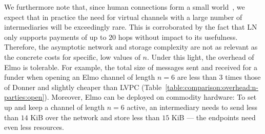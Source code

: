  We furthermore note that, since human connections form a
  small world~\cite{smallworld}, we expect that in practice the
  need for virtual channels with a large number of
  intermediaries will be exceedingly rare. This is corroborated by
  the fact that LN only supports payments of up to $20$ hops
  without impact to its usefulness. Therefore, the asymptotic
  network and storage complexity are not as relevant as the
  concrete costs for specific, low values of $n$. Under this
  light, the overhead of Elmo is tolerable. For example, the
  total size of messages sent and received for a funder when opening an Elmo channel
  of length $n=6$ are less than $3$ times those of Donner and
  slightly cheaper than LVPC
  (Table~\ref{table:comparison:overhead:n-parties:open}).
  Moreover, Elmo can be deployed on commodity hardware: To set up
  and keep a channel of length $n=6$ active, an intermediary needs to send less
  than $14$ KiB over the network and store less than $15$ KiB --- the endpoints
  need even less resources.

